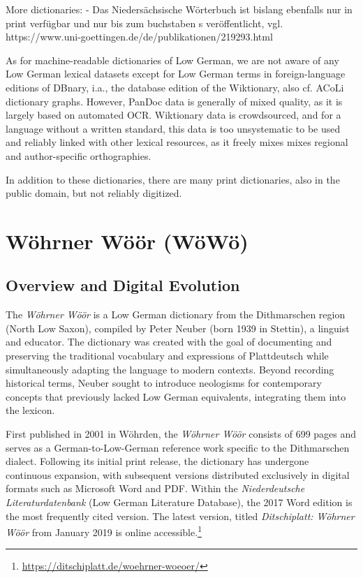 \documentclass[11pt]{article}
\begin{document}
More dictionaries:
- Das Niedersächsische Wörterbuch ist bislang ebenfalls nur in print verfügbar und nur bis zum buchstaben s veröffentlicht, vgl. https://www.uni-goettingen.de/de/publikationen/219293.html



As for machine-readable dictionaries of Low German, we are not aware of any Low German lexical datasets except for Low German terms in foreign-language editions of DBnary, i.a., the database edition of the Wiktionary, also cf. ACoLi dictionary graphs. However, PanDoc data is generally of mixed quality, as it is largely based on automated OCR. Wiktionary data is crowdsourced, and for a language without a written standard, this data is too unsystematic to be used and reliably linked with other lexical resources, as it freely mixes mixes regional and author-specific orthographies.

In addition to these dictionaries, there are many print dictionaries, also in the public domain, but not reliably digitized.

\section{Wöhrner Wöör (WöWö)}

\subsection{Overview and Digital Evolution}

The \emph{Wöhrner Wöör} is a Low German dictionary from the Dithmarschen region (North Low Saxon), compiled by Peter Neuber (born 1939 in Stettin), a linguist and educator. The dictionary was created with the goal of documenting and preserving the traditional vocabulary and expressions of Plattdeutsch while simultaneously adapting the language to modern contexts. Beyond recording historical terms, Neuber sought to introduce neologisms for contemporary concepts that previously lacked Low German equivalents, integrating them into the lexicon.

First published in 2001 in Wöhrden, the \emph{Wöhrner Wöör} consists of 699 pages and serves as a German-to-Low-German reference work specific to the Dithmarschen dialect. Following its initial print release, the dictionary has undergone continuous expansion, with subsequent versions distributed exclusively in digital formats such as Microsoft Word and PDF. Within the \emph{Niederdeutsche Literaturdatenbank} (Low German Literature Database), the 2017 Word edition is the most frequently cited version. The latest version, titled \emph{Ditschiplatt: Wöhrner Wöör} from January 2019 is online accessible.\footnote{\url{https://ditschiplatt.de/woehrner-woeoer/}}
\end{document}
